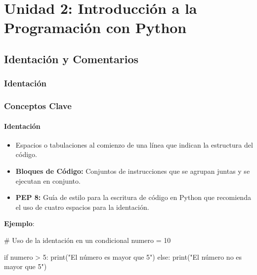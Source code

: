 \documentclass[
  a4paper,
  DIV=11,
  numbers=noendperiod,
  onepage,
  openany]{scrreprt}
\newenvironment{Shaded}{\begin{snugshade}}{\end{snugshade}}
\newcommand{\BuiltInTok}[1]{\textcolor[rgb]{0.00,0.23,0.31}{#1}}
\newcommand{\CommentTok}[1]{\textcolor[rgb]{0.37,0.37,0.37}{#1}}
\newcommand{\ControlFlowTok}[1]{\textcolor[rgb]{0.00,0.23,0.31}{#1}}
\newcommand{\DecValTok}[1]{\textcolor[rgb]{0.68,0.00,0.00}{#1}}
\newcommand{\NormalTok}[1]{\textcolor[rgb]{0.00,0.23,0.31}{#1}}
\newcommand{\OperatorTok}[1]{\textcolor[rgb]{0.37,0.37,0.37}{#1}}
\newcommand{\StringTok}[1]{\textcolor[rgb]{0.13,0.47,0.30}{#1}}
\providecommand{\tightlist}{%
  \setlength{\itemsep}{0pt}\setlength{\parskip}{0pt}}\usepackage{longtable,booktabs,array}
\begin{document}
\part{Unidad 2: Introducción a la Programación con Python}

\chapter{Identación y Comentarios}\label{identaciuxf3n-y-comentarios}

\section{Identación}\label{identaciuxf3n}

\section{Conceptos Clave}\label{conceptos-clave-2}

\subsection{Identación}\label{identaciuxf3n-1}

\begin{itemize}
\tightlist
\item
  Espacios o tabulaciones al comienzo de una línea que indican la
  estructura del código.
\item
  \textbf{Bloques de Código:} Conjuntos de instrucciones que se agrupan
  juntas y se ejecutan en conjunto.
\item
  \textbf{PEP 8:} Guía de estilo para la escritura de código en Python
  que recomienda el uso de cuatro espacios para la identación.
\end{itemize}

\textbf{Ejemplo}:

\begin{Shaded}
\begin{Highlighting}[]
\CommentTok{\# Uso de la identación en un condicional}
\NormalTok{numero }\OperatorTok{=} \DecValTok{10}

\ControlFlowTok{if}\NormalTok{ numero }\OperatorTok{\textgreater{}} \DecValTok{5}\NormalTok{:}
    \BuiltInTok{print}\NormalTok{(}\StringTok{"El número es mayor que 5"}\NormalTok{)}
\ControlFlowTok{else}\NormalTok{:}
    \BuiltInTok{print}\NormalTok{(}\StringTok{"El número no es mayor que 5"}\NormalTok{)}
\end{Highlighting}
\end{Shaded}
\end{document}
